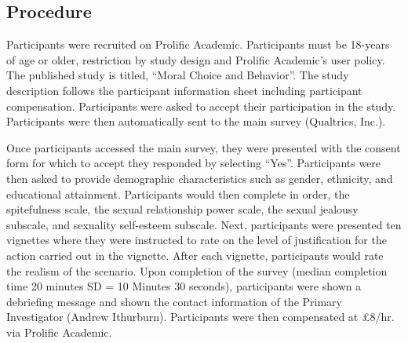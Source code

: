 \documentclass[
  donotrepeattitle,doc, 12pt, a4paper,floatsintext]{apa7}
\begin{document}
\hypertarget{procedure}{%
\subsection{Procedure}\label{procedure}}

Participants were recruited on Prolific Academic. Participants must be 18-years of age or older, restriction by study design and Prolific Academic's user policy. The published study is titled, ``Moral Choice and Behavior''. The study description follows the participant information sheet including participant compensation. Participants were asked to accept their participation in the study. Participants were then automatically sent to the main survey (Qualtrics, Inc.).

Once participants accessed the main survey, they were presented with the consent form for which to accept they responded by selecting ``Yes''. Participants were then asked to provide demographic characteristics such as gender, ethnicity, and educational attainment. Participants would then complete in order, the spitefulness scale, the sexual relationship power scale, the sexual jealousy subscale, and sexuality self-esteem subscale. Next, participants were presented ten vignettes where they were instructed to rate on the level of justification for the action carried out in the vignette. After each vignette, participants would rate the realism of the scenario. Upon completion of the survey (median completion time 20 minutes SD = 10 Minutes 30 seconds), participants were shown a debriefing message and shown the contact information of the Primary Investigator (Andrew Ithurburn). Participants were then compensated at £8/hr. via Prolific Academic.
\end{document}
